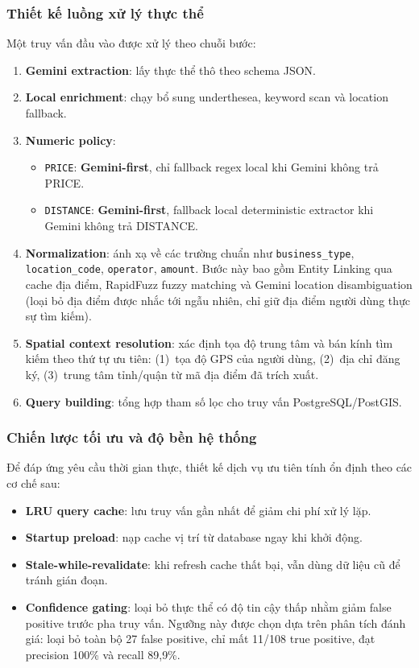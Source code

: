\subsubsection{Thiết kế luồng xử lý thực thể}

Một truy vấn đầu vào được xử lý theo chuỗi bước:
\begin{enumerate}
    \item \textbf{Gemini extraction}: lấy thực thể thô theo schema JSON.
    \item \textbf{Local enrichment}: chạy bổ sung underthesea, keyword scan và location fallback.
    \item \textbf{Numeric policy}:
    \begin{itemize}
        \item \texttt{PRICE}: \textbf{Gemini-first}, chỉ fallback regex local khi Gemini không trả PRICE.
        \item \texttt{DISTANCE}: \textbf{Gemini-first}, fallback local deterministic extractor khi Gemini không trả DISTANCE.
    \end{itemize}
    \item \textbf{Normalization}: ánh xạ về các trường chuẩn như \texttt{business\_type}, \texttt{location\_code}, \texttt{operator}, \texttt{amount}. Bước này bao gồm Entity Linking qua cache địa điểm, RapidFuzz fuzzy matching và Gemini location disambiguation (loại bỏ địa điểm được nhắc tới ngẫu nhiên, chỉ giữ địa điểm người dùng thực sự tìm kiếm).
    \item \textbf{Spatial context resolution}: xác định tọa độ trung tâm và bán kính tìm kiếm theo thứ tự ưu tiên: (1)~tọa độ GPS của người dùng, (2)~địa chỉ đăng ký, (3)~trung tâm tỉnh/quận từ mã địa điểm đã trích xuất.
    \item \textbf{Query building}: tổng hợp tham số lọc cho truy vấn PostgreSQL/PostGIS.
\end{enumerate}

\subsubsection{Chiến lược tối ưu và độ bền hệ thống}

Để đáp ứng yêu cầu thời gian thực, thiết kế dịch vụ ưu tiên tính ổn định theo các cơ chế sau:
\begin{itemize}
    \item \textbf{LRU query cache}: lưu truy vấn gần nhất để giảm chi phí xử lý lặp.
    \item \textbf{Startup preload}: nạp cache vị trí từ database ngay khi khởi động.
    \item \textbf{Stale-while-revalidate}: khi refresh cache thất bại, vẫn dùng dữ liệu cũ để tránh gián đoạn.
    \item \textbf{Confidence gating}: loại bỏ thực thể có độ tin cậy thấp nhằm giảm false positive trước pha truy vấn. Ngưỡng này được chọn dựa trên phân tích đánh giá: loại bỏ toàn bộ 27 false positive, chỉ mất 11/108 true positive, đạt precision 100\% và recall 89{,}9\%.
\end{itemize}

